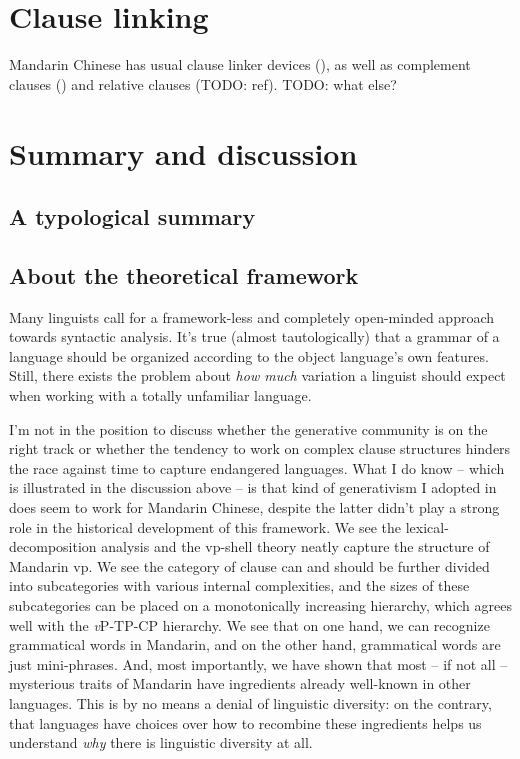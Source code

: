 \documentclass[UTF8, a4paper, oneside, scheme=plain]{ctexrep}
\newcommand{\vP}{\textit{v}P}
\begin{document}
\chapter{Clause linking}\label{chap:clause-linking}

Mandarin Chinese has usual clause linker devices (),
as well as complement clauses ()
and relative clauses (TODO: ref). TODO: what else?

\chapter{Summary and discussion}

\section{A typological summary}

\section{About the theoretical framework}

Many linguists call for a framework-less and completely open-minded approach towards syntactic analysis.
It's true (almost tautologically) that a grammar of a language 
should be organized according to the object language's 
own features.
Still, there exists the problem about \emph{how much} variation 
a linguist should expect when working with a totally unfamiliar language.

I'm not in the position to discuss whether the generative community 
is on the right track 
or whether the tendency to work on complex clause structures 
hinders the race against time to capture 
endangered languages.
What I do know -- which is illustrated in the discussion above -- 
is that kind of generativism I adopted in 
does seem to work for Mandarin Chinese, 
despite the latter didn't play a strong role 
in the historical development of this framework.
We see the lexical-decomposition analysis 
and the \acs{vp}-shell theory 
neatly capture the structure of Mandarin \acs{vp}.
We see the category of clause can and should be 
further divided into subcategories with various internal complexities,
and the sizes of these subcategories can be placed on 
a monotonically increasing hierarchy,
which agrees well with the \vP-TP-CP hierarchy.
We see that on one hand, 
we can recognize grammatical words in Mandarin, 
and on the other hand, 
grammatical words are just mini-phrases.
And, most importantly, we have shown that most -- if not all -- mysterious traits 
of Mandarin have ingredients already well-known in other languages.
This is by no means a denial of linguistic diversity: 
on the contrary, 
that languages have choices over how to recombine these ingredients
helps us understand \emph{why} there is linguistic diversity at all.
\end{document}
